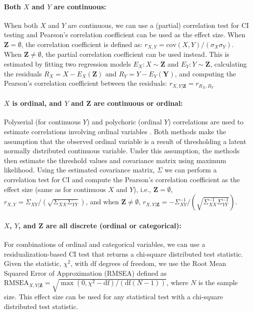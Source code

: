 \documentclass[accepted]{uai2025} %
\begin{document}
\paragraph{Both $ X $ and $ Y $ are continuous: }
When both $ X $ and $ Y $ are continuous, we can use a (partial) correlation
test for CI testing and Pearson's correlation coefficient can be used as the
effect size. When $ \bm{Z} = \emptyset $, the correlation coefficient is
defined as: $ r_{X, Y} = \mathrm{cov}(X, Y) / (\sigma_X \sigma_Y) $. When $
\bm{Z} \neq \emptyset $, the partial correlation coefficient can be used instead.
This is estimated by fitting two regression models $ E_X: X \sim \bm{Z} $ and $ E_Y: Y
\sim \bm{Z} $, calculating the residuals $ R_X = X - E_X(\bm{Z}) $ and $ R_Y =
Y - E_Y(\bm{Y}) $, and computing the Pearson's correlation coefficient between the
residuals: $r_{X, Y \rvert \bm{Z}} = r_{R_X, R_Y}$

\paragraph{$ X $ is ordinal, and $ Y $ and $ \bm{Z} $  are continuous or ordinal: }

Polyserial (for continuous $Y$) and polychoric
(ordinal $Y$) correlations are used to estimate correlations 
involving ordinal variables \citep{Poon1987}. Both methods make the assumption that the
observed ordinal variable is a result of thresholding a latent normally
distributed continuous variable. Under this assumption, the methods then 
estimate the threshold values and covariance matrix using maximum likelihood.
Using the estimated covariance matrix, $ \Sigma $ we can perform a correlation
test for CI and compute the Pearson's correlation coefficient as the effect
size (same as for continuous $ X $ and $ Y $), i.e., 
$\bm{Z} = \emptyset $, $ r_{X, Y} = \Sigma_{XY} / (\sqrt{\Sigma_{XX} \Sigma_{YY}}) $, 
	and when $ \bm{Z} \ne \emptyset $,
	$ r_{X, Y \rvert \bm{Z}} = - \Sigma^{-1}_{XY}/ (\sqrt{\Sigma^{-1}_{XX} \Sigma^{-1}_{YY}}) $.

\paragraph{$ X $, $ Y $, and $ \bm{Z} $ are all discrete (ordinal or categorical): }

For combinations of ordinal and categorical variables, we
can use a residualization-based CI test \citep{Ankan2023} that returns a 
chi-square distributed test statistic. Given the statistic, $ \chi^2 $, with $ \textrm{df} $ degrees of
freedom, we use the Root Mean Squared Error of Approximation (RMSEA) defined as
 $ \textrm{RMSEA}_{X, Y \rvert \bm{Z}} =
\sqrt{\max(0,\chi^2 - \textrm{df})/ (\textrm{df} (N-1))} $, where $ N $ is the sample
size. This effect size can be used for any statistical test with a chi-square 
distributed test statistic. 
\end{document}
